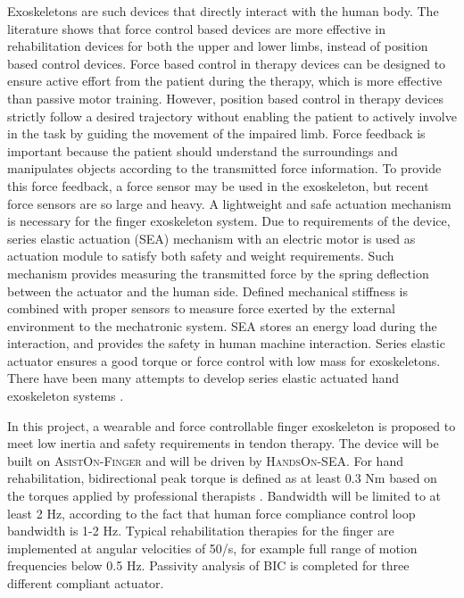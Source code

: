 \documentclass[a4paper,12pt]{article}
\begin{document}
Exoskeletons are such devices that directly interact with the human body. The literature shows that force control based devices are more effective in rehabilitation devices for both the upper\cite{Blank2014} and lower limbs\cite{Marchal-Crespo2009}, instead of position based control devices\cite{harwin}. Force based control in therapy devices can be designed to ensure active effort from the patient during the therapy, which is more effective than passive motor training\cite{lotze}. However, position based control in therapy devices strictly follow a desired trajectory without enabling the patient to actively involve in the task by guiding the movement of the impaired limb\cite{Bernhardt2005HybridFC}\cite{agarwalindex}. Force feedback is important because the patient should understand the surroundings and manipulates objects according to the transmitted force information\cite{jobae}. To provide this force feedback, a force sensor may be used in the exoskeleton, but recent force sensors are so large and heavy. A lightweight and safe actuation mechanism is necessary for the finger exoskeleton system. Due to requirements of the device, series elastic actuation (SEA) mechanism with an electric motor is used as actuation module to satisfy both safety and weight requirements. Such mechanism provides measuring the transmitted force by the spring deflection between the actuator and the human side. Defined mechanical stiffness is combined with proper sensors to measure force exerted by the external environment to the mechatronic system. SEA stores an energy load during the interaction, and provides the safety in human machine interaction\cite{BIANCHI20188}. Series elastic actuator ensures a good torque or force control with low mass for exoskeletons. There have been many attempts to develop series elastic actuated hand exoskeleton systems \cite{jobae}\cite{inseongbae}\cite{BIANCHI20188}\cite{agarwalindex} .

In this project, a wearable and force controllable finger exoskeleton is proposed to meet low inertia and safety requirements in tendon therapy. The device will be built on \textsc{AsistOn-Finger}\cite{ertas}  and will be driven by \textsc{HandsOn-SEA}\cite{handsonsea}. For hand rehabilitation, bidirectional peak torque is defined as at least 0.3 Nm based on the torques applied by professional therapists \cite{Ueki2012DevelopmentOA}. Bandwidth will be limited to at least 2 Hz, according to the fact that human force compliance control loop bandwidth is 1-2 Hz\cite{chan}\cite{sheridan}. Typical rehabilitation therapies for the finger are implemented at angular velocities of 50\degree/s, for example full range of motion frequencies below 0.5 Hz\cite{Adamovich}\cite{kawasaki}. 
Passivity analysis of BIC is completed for three different compliant actuator.  
\end{document}
